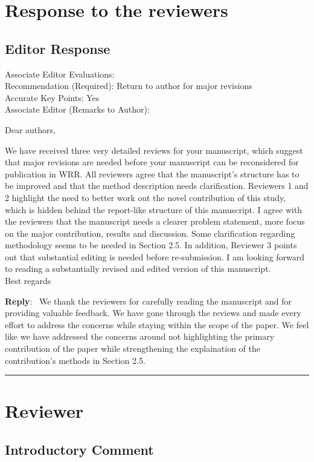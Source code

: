 \documentclass[11pt]{article}
\newcounter{reviewer}
\newcounter{point}[reviewer]
\newcommand{\reviewersection}{\stepcounter{reviewer} \bigskip \hrule
                  \section*{Reviewer \thereviewer}}
\newenvironment{reply}
   {\medskip \noindent \begin{sf}\textbf{Reply}:\  }
   {\medskip \end{sf}}
\begin{document}
\section*{Response to the reviewers}

\subsection*{Editor Response}

Associate Editor Evaluations: \\
Recommendation (Required): Return to author for major revisions \\
Accurate Key Points: Yes \\
\noindent
Associate Editor (Remarks to Author): 

Dear authors,

We have received three very detailed reviews for your manuscript, which suggest that major revisions are needed before your manuscript can be reconsidered for publication in WRR.
All reviewers agree that the manuscript's structure has to be improved and that the method description needs clarification.
Reviewers 1 and 2 highlight the need to better work out the novel contribution of this study, which is hidden behind the report-like structure of this manuscript.
I agree with the reviewers that the manuscript needs a clearer problem statement, more focus on the major contribution, results and discussion.
Some clarification regarding methodology seems to be needed in Section 2.5.
In addition, Reviewer 3 points out that substantial editing is needed before re-submission.
I am looking forward to reading a substantially revised and edited version of this manuscript.\\

Best regards

\begin{reply}
We thank the reviewers for carefully reading the manuscript and for providing valuable feedback.
We have gone through the reviews and made every effort to address the concerns while staying within the scope of the paper.
We feel like we have addressed the concerns around not highlighting the primary contribution of the paper while strengthening the explaination of the contribution's methods in Section 2.5.
\end{reply}

\reviewersection

\subsection*{Introductory Comment}
\end{document}
